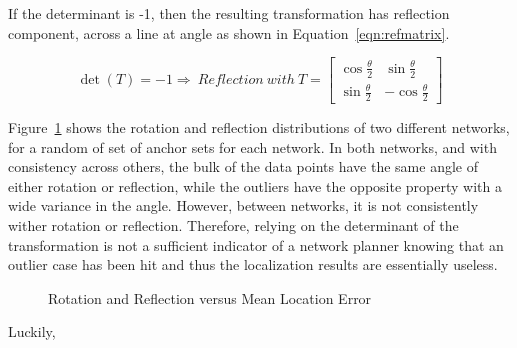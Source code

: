 If the determinant is -1, then the resulting transformation has reflection component, across a line at angle as shown in Equation~\ref{eqn:refmatrix}. 

\begin{equation}
	\det{(T)}=-1 \Rightarrow ~Reflection ~with ~T=
	\begin{bmatrix}
	\cos{\frac{\theta}{2}} & \sin{\frac{\theta}{2}} \\ 
	\sin{\frac{\theta}{2}} & -\cos{\frac{\theta}{2}}\end{bmatrix}
	\label{eqn:refmatrix} 
\end{equation}

Figure~\ref{fig:rotref} shows the rotation and reflection distributions of two different networks, for a random of set of anchor sets for each network.  In both networks, and with consistency across others, the bulk of the data points have the same angle of either rotation or reflection, while the outliers have the opposite property with a wide variance in the angle.  However, between networks, it is not consistently wither rotation or reflection.  Therefore, relying on the determinant of the transformation is not a sufficient indicator of a network planner knowing that an outlier case has been hit and thus the localization results are essentially useless.

\begin{figure}
  \centering
	\caption{Rotation and Reflection versus Mean Location Error}	
	\label{fig:rotref}
\end{figure}

Luckily,

